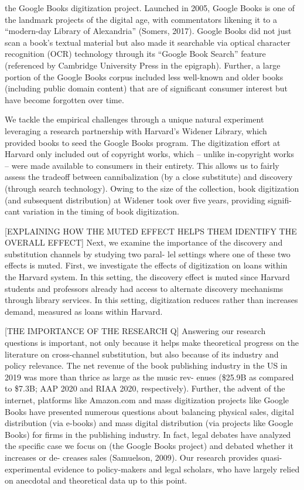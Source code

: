 \documentclass{article}
\begin{document}
the Google Books digitization project. Launched in 2005, Google Books is one of the
landmark projects of the digital age, with commentators likening it to a “modern-day Library of Alexandria”
(Somers, 2017). Google Books did not just scan a book’s textual material but also made it searchable via
optical character recognition (OCR) technology through its “Google Book Search” feature (referenced by
Cambridge University Press in the epigraph). Further, a large portion of the Google Books corpus included
less well-known and older books (including public domain content) that are of significant consumer interest
but have become forgotten over time.

We tackle the empirical challenges through a unique natural experiment leveraging a research partnership with Harvard’s Widener Library, which provided books to seed the Google Books program. The digitization effort at Harvard only included out of copyright works, which – unlike in-copyright works – were made available to consumers in their entirety. This allows us to fairly assess the tradeoff between cannibalization (by a close substitute) and discovery (through search technology). Owing to the size of the collection, book digitization (and subsequent distribution) at Widener took over five years, providing signifi- cant variation in the timing of book digitization.

[EXPLAINING HOW THE MUTED EFFECT HELPS THEM IDENTIFY THE OVERALL EFFECT]
Next, we examine the importance of the discovery and substitution channels by studying two paral- lel settings where one of these two effects is muted. First, we investigate the effects of digitization on loans within the Harvard system. In this setting, the discovery effect is muted since Harvard students and professors already had access to alternate discovery mechanisms through library services. In this setting, digitization reduces rather than increases demand, measured as loans within Harvard. 

 [THE IMPORTANCE OF THE RESEARCH Q]
Answering our research questions is important, not only because it helps make theoretical progress on the literature on cross-channel substitution, but also because of its industry and policy relevance. The net revenue of the book publishing industry in the US in 2019 was more than thrice as large as the music rev- enues (\$25.9B as compared to \$7.3B; AAP 2020 and RIAA 2020, respectively). Further, the advent of the internet, platforms like Amazon.com and mass digitization projects like Google Books have presented numerous questions about balancing physical sales, digital distribution (via e-books) and mass digital distribution (via projects like Google Books) for firms in the publishing industry. In fact, legal debates have analyzed the specific case we focus on (the Google Books project) and debated whether it increases or de- creases sales (Samuelson, 2009). Our research provides quasi-experimental evidence to policy-makers and legal scholars, who have largely relied on anecdotal and theoretical data up to this point.
\end{document}
